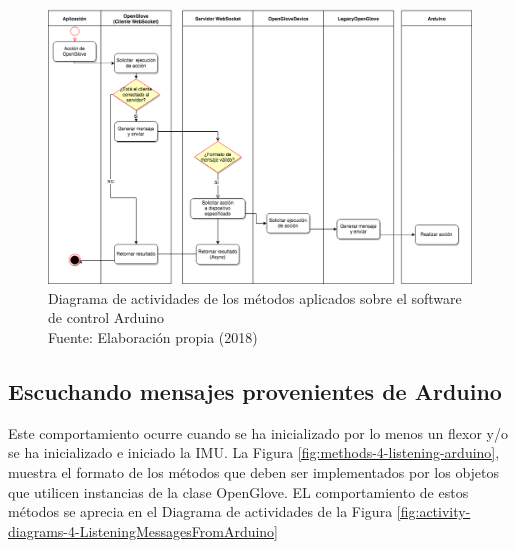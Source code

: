 \begin{figure}[H]
  \begin{center} 
   	\includegraphics[width=1.0\textwidth]{images/chapter04/ActivityDiagrams-OpenGloveActions-3.png} 
   \captionsetup{justification=centering}
    \caption[Diagrama de actividades de los métodos aplicados sobre el software de control Arduino]{Diagrama de actividades de los métodos aplicados sobre el software de control Arduino\\Fuente: Elaboración propia (2018)}
    \label{fig:activity-diagrams-3-openglove-arduino}
  \end{center}
\end{figure}


\subsection{Escuchando mensajes provenientes de Arduino}
\label{subsection:reading-openglove-arduino}
Este comportamiento ocurre cuando se ha inicializado por lo menos un flexor y/o se ha inicializado e iniciado la IMU. La Figura \ref{fig:methods-4-listening-arduino}, muestra el formato de los métodos que deben ser implementados por los objetos que utilicen instancias de la clase OpenGlove. EL comportamiento de estos métodos se aprecia en el Diagrama de actividades de la Figura \ref{fig:activity-diagrams-4-ListeningMessagesFromArduino}

